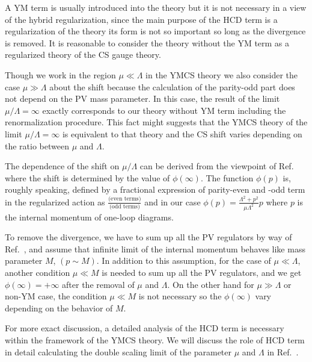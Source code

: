\documentclass[a4paper,12pt]{article}
\begin{document}
%
A YM term is usually introduced into the theory but it is not necessary
in a view of the hybrid regularization,
since the main purpose of the HCD term is a regularization of the theory
its form is not so important
so long as the divergence is removed.
%
It is reasonable to consider the theory without the YM term
as a regularized theory of the CS gauge theory.

%
Though we work in the region $\mu\ll\Lambda$ in the YMCS theory
we also consider the case $\mu\gg\Lambda$ about the shift
because the calculation of the parity-odd part does not depend on
the PV mass parameter.
%
In this case,
the result of the limit $\mu / \Lambda = \infty$
exactly corresponds to our theory without YM term
including the renormalization procedure.
%
This fact might suggests that
the YMCS theory of the limit $\mu / \Lambda = \infty$
is equivalent to that theory
and the CS shift varies depending on the ratio between $\mu$ and $\Lambda$.

%
The dependence of the shift on $\mu / \Lambda$
can be derived from the viewpoint of Ref.~\cite{Asorey:1994em}
where the shift is determined by the value of $\phi (\infty)$.
%
The function $\phi (p)$ is, roughly speaking,
defined by a fractional expression of parity-even and -odd term
in the regularized action as
$\frac{\textrm{(even terms)}}{\textrm{(odd terms)}}$
and in our case $\phi (p) = \frac{\Lambda^2+p^2}{\mu\Lambda^2}p$
where $p$ is the internal momentum of one-loop diagrams.

To remove the divergence,
we have to sum up all the PV regulators by way of Ref.~\cite{Nittoh:2000it,Nittoh:2001full},
and assume that
infinite limit of the internal momentum behaves like mass parameter $M$,
$(p\sim M)$.
%
In addition to this assumption, for the case of $\mu \ll \Lambda$,
another condition $\mu \ll M$ is needed to sum up all the PV regulators,
and we get $\phi (\infty) = +\infty$
after the removal of $\mu$ and $\Lambda$.
%
On the other hand for $\mu \gg \Lambda$ or non-YM case,
the condition $\mu \ll M$ is not necessary
so the $\phi (\infty)$ vary depending on the behavior of $M$.


For more exact discussion,
a detailed analysis of the HCD term is necessary
within the framework of the YMCS theory.
%
We will discuss the role of HCD term in detail
calculating the double scaling limit
of the parameter $\mu$ and $\Lambda$
in Ref.~\cite{Nittoh:2001full}.
\end{document}
